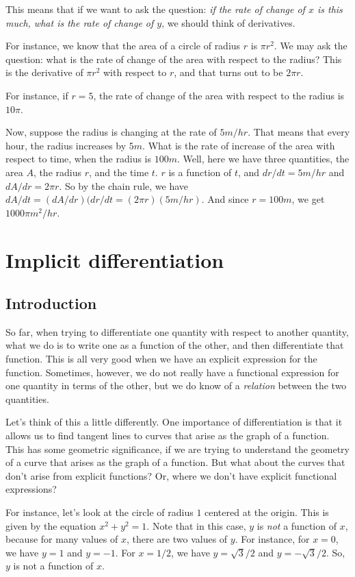 \documentclass[10pt]{amsart}
\begin{document}
This means that if we want to ask the question: {\em if the rate of
change of $x$ is this much, what is the rate of change of $y$}, we
should think of derivatives.

For instance, we know that the area of a circle of radius $r$ is $\pi
r^2$. We may ask the question: what is the rate of change of the area
with respect to the radius? This is the derivative of $\pi r^2$ with
respect to $r$, and that turns out to be $2\pi r$.

For instance, if $r = 5$, the rate of change of the area with respect
to the radius is $10\pi$.

Now, suppose the radius is changing at the rate of $5 m/hr$. That
means that every hour, the radius increases by $5m$. What is the rate
of increase of the area with respect to time, when the radius is
$100m$. Well, here we have three quantities, the area $A$, the radius
$r$, and the time $t$. $r$ is a function of $t$, and $dr/dt = 5 m/hr$
and $dA/dr = 2\pi r$. So by the chain rule, we have $dA/dt =
(dA/dr)(dr/dt = (2\pi r) (5m/hr)$. And since $r = 100m$, we get
$1000\pi m^2/hr$.

\section{Implicit differentiation}

\subsection{Introduction}

So far, when trying to differentiate one quantity with respect to
another quantity, what we do is to write one as a function of the
other, and then differentiate that function. This is all very good
when we have an explicit expression for the function. Sometimes,
however, we do not really have a functional expression for one
quantity in terms of the other, but we do know of a {\em relation}
between the two quantities.

Let's think of this a little differently. One importance of
differentiation is that it allows us to find tangent lines to curves
that arise as the graph of a function. This has some geometric
significance, if we are trying to understand the geometry of a curve
that arises as the graph of a function. But what about the curves that
don't arise from explicit functions? Or, where we don't have explicit
functional expressions?

For instance, let's look at the circle of radius $1$ centered at the
origin. This is given by the equation $x^2 + y^2 = 1$. Note that in
this case, $y$ is {\em not} a function of $x$, because for many values
of $x$, there are two values of $y$. For instance, for $x = 0$, we
have $y = 1$ and $y = -1$. For $x = 1/2$, we have $y = \sqrt{3}/2$ and
$y = -\sqrt{3}/2$. So, $y$ is not a function of $x$.
\end{document}
